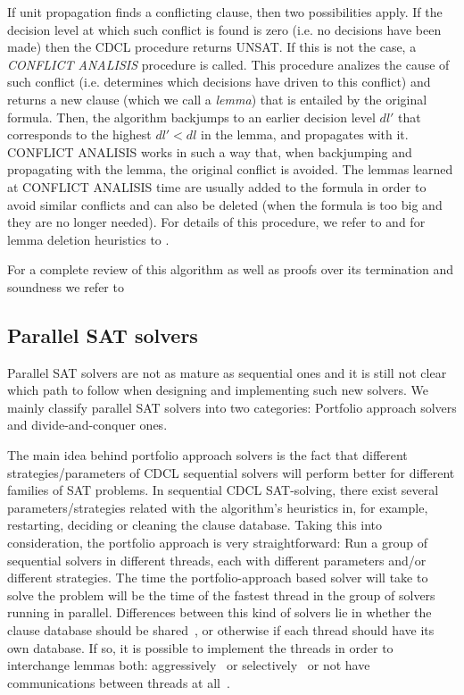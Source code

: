 \documentclass{llncs}
\begin{document}
If unit propagation finds a conflicting clause, then two possibilities
apply. If the decision level at which such conflict is found is zero
(i.e. no decisions have been made) then the CDCL procedure returns
UNSAT. If this is not the case, a \emph{CONFLICT ANALISIS} procedure
is called. This procedure analizes the cause of such conflict
(i.e. determines which decisions have driven to this conflict) and
returns a new clause (which we call a \emph{lemma}) that is entailed
by the original formula. Then, the algorithm backjumps to an earlier
decision level $dl'$ that corresponds to the highest $dl'<dl$ in the
lemma, and propagates with it.  CONFLICT ANALISIS works in such a way
that, when backjumping and propagating with the lemma, the original
conflict is avoided. The lemmas learned at CONFLICT ANALISIS time are
usually added to the formula in order to avoid similar conflicts and
can also be deleted (when the formula is too big and they are no
longer needed). For details of this procedure, we refer to
\cite{GRASP1999IEEE,Zhang2001} and for lemma deletion heuristics to
\cite{Relsat97,Goldberg2002DATE,gluclose}.

For a complete review of this algorithm as well as proofs over its
termination and soundness we refer to \cite{Nieuwenhuisetal2006JACM}


\subsection{Parallel SAT solvers}

Parallel SAT solvers are not as mature as sequential ones and it is
still not clear which path to follow when designing and implementing
such new solvers.  We mainly classify parallel SAT solvers into two
categories: Portfolio approach solvers and divide-and-conquer ones.

The main idea behind portfolio approach solvers is the fact that
different strategies/parameters of CDCL sequential solvers will
perform better for different families of SAT problems.  In sequential
CDCL SAT-solving, there exist several parameters/strategies related
with the algorithm's heuristics in, for example, restarting, deciding
or cleaning the clause database. Taking this into consideration, the
portfolio approach is very straightforward: Run a group of sequential
solvers in different threads, each with different parameters and/or
different strategies. The time the portfolio-approach based solver
will take to solve the problem will be the time of the fastest thread
in the group of solvers running in parallel.  Differences between this
kind of solvers lie in whether the clause database should be
shared~\cite{Sartagnan}, or otherwise if each thread should have its
own database. If so, it is possible to implement the threads in order
to interchange lemmas both: aggressively~\cite{ManySAT} or
selectively~\cite{plingeling} or not have communications between
threads at all~\cite{ppfolio}.
\end{document}
